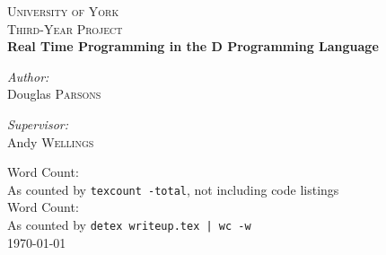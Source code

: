 \begin{titlepage}
\begin{center}


\textsc{\LARGE University of York}\\[1.5cm]

\textsc{\Large Third-Year Project}\\[0.5cm]

\HRule{\\[0.4cm]}
{\huge\bfseries{Real Time Programming in the D Programming Language}\\[0.4cm] }

\HRule{\\[1.5cm]}

\noindent
\begin{minipage}[t]{0.4\textwidth}
\begin{flushleft} \large
\emph{Author:}\\
Douglas \textsc{Parsons}
\end{flushleft}
\end{minipage}
\begin{minipage}[t]{0.4\textwidth}
\begin{flushright} \large
\emph{Supervisor:} \\
Andy \textsc{Wellings}
\end{flushright}
\end{minipage}

\vfill
 
{\small Word Count: \wordcount \\}
\vspace{5mm}
{\small As counted by \texttt{texcount -total}, not including code listings \\}
\vspace{5mm}
{\small Word Count: \wrdcount \\}
\vspace{5mm}
{\small As counted by \texttt{detex writeup.tex | wc -w} \\}
\vspace{15mm}
{\large \today}

\end{center}
\end{titlepage}
